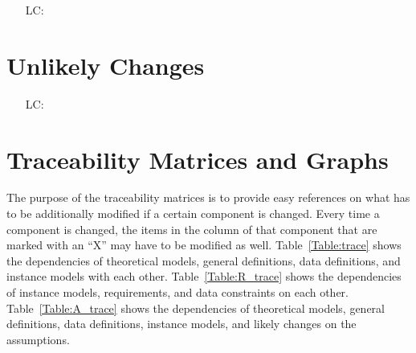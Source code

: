 \documentclass[12pt]{article}
\newcounter{lcnum} %
\begin{document}
\noindent \begin{itemize}

	\item[LC\refstepcounter{lcnum}\thelcnum\label{LC_meaningfulLabel}:] 

\end{itemize}

\section{Unlikely Changes}

\noindent \begin{itemize}

	\item[LC\refstepcounter{lcnum}\thelcnum\label{LC_meaningfulLabel}:] 

\end{itemize}

\section{Traceability Matrices and Graphs}

The purpose of the traceability matrices is to provide easy references on what has to be
additionally modified if a certain component is changed. Every time a component is changed, the
items in the column of that component that are marked with an ``X'' may have to be modified as
well. Table~\ref{Table:trace} shows the dependencies of theoretical models, general definitions,
data definitions, and instance models with each other. Table~\ref{Table:R_trace} shows the
dependencies of instance models, requirements, and data constraints on each other.
Table~\ref{Table:A_trace} shows the dependencies of theoretical models, general definitions, data
definitions, instance models, and likely changes on the assumptions.



\end{document}
